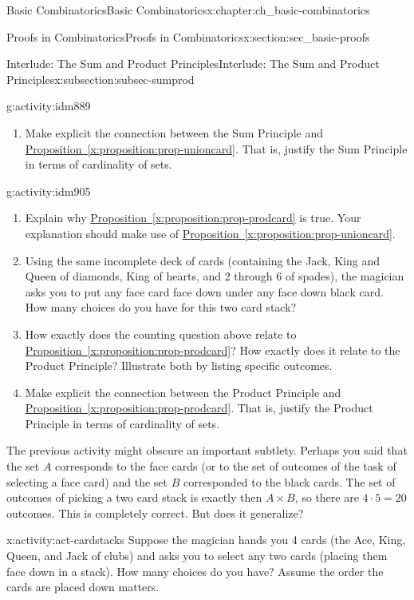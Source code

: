 \documentclass[oneside,10pt,]{book}
\numberwithin{equation}{chapter}
\begin{document}
\begin{chapterptx}{Basic Combinatorics}{}{Basic Combinatorics}{}{}{x:chapter:ch_basic-combinatorics}
\begin{sectionptx}{Proofs in Combinatorics}{}{Proofs in Combinatorics}{}{}{x:section:sec_basic-proofs}
\begin{subsectionptx}{Interlude: The Sum and Product Principles}{}{Interlude: The Sum and Product Principles}{}{}{x:subsection:subsec-sumprod}
\begin{activity}{}{g:activity:idm889}
\begin{enumerate}[font=\bfseries,label=(\alph*),ref=\alph*]
\item{}Make explicit the connection between the Sum Principle and \hyperref[x:proposition:prop-unioncard]{Proposition~\ref{x:proposition:prop-unioncard}}.  That is, justify the Sum Principle in terms of cardinality of sets.%
\end{enumerate}
\end{activity}
\begin{activity}{}{g:activity:idm905}%
\begin{enumerate}[font=\bfseries,label=(\alph*),ref=\alph*]
\item{}Explain why \hyperref[x:proposition:prop-prodcard]{Proposition~\ref{x:proposition:prop-prodcard}} is true.  Your explanation should make use of \hyperref[x:proposition:prop-unioncard]{Proposition~\ref{x:proposition:prop-unioncard}}.%
\item{}Using the same incomplete deck of cards (containing the Jack, King and Queen of diamonds, King of hearts, and 2 through 6 of spades), the magician asks you to put any face card face down under any face down black card.  How many choices do you have for this two card stack?%
\item{}How exactly does the counting question above relate to \hyperref[x:proposition:prop-prodcard]{Proposition~\ref{x:proposition:prop-prodcard}}?  How exactly does it relate to the Product Principle?  Illustrate both by listing specific outcomes.%
\item{}Make explicit the connection between the Product Principle and \hyperref[x:proposition:prop-prodcard]{Proposition~\ref{x:proposition:prop-prodcard}}.  That is, justify the Product Principle in terms of cardinality of sets.%
\end{enumerate}
\end{activity}
The previous activity might obscure an important subtlety.  Perhaps you said that the set \(A\) corresponds to the face cards (or to the set of outcomes of the task of selecting a face card) and the set \(B\) corresponded to the black cards.  The set of outcomes of picking a two card stack is exactly then \(A \times B\), so there are \(4\cdot 5 = 20\) outcomes.  This is completely correct.  But does it generalize?%
\begin{activity}{}{x:activity:act-cardstacks}%
Suppose the magician hands you 4 cards (the Ace, King, Queen, and Jack of clubs) and asks you to select any two cards (placing them face down in a stack).  How many choices do you have?  Assume the order the cards are placed down matters.%
\begin{enumerate}[font=\bfseries,label=(\alph*),ref=\alph*]

\end{enumerate}
\end{activity}
\end{subsectionptx}
\end{sectionptx}
\end{chapterptx}
\end{document}
